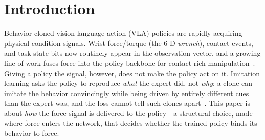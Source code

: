 \section{Introduction}
\label{sec:intro}

Behavior-cloned vision-language-action (VLA) policies are rapidly acquiring physical condition
signals. Wrist force/torque (the 6-D \emph{wrench}), contact events, and task-state bits now
routinely appear in the
observation vector, and a growing line of work fuses force into the policy backbone for
contact-rich manipulation~\cite{forcevla,phaforce,forceflow,filic}. Giving a policy the
signal, however, does not make the policy act on it. Imitation learning asks the policy to
reproduce \emph{what} the expert did, not \emph{why}: a clone can imitate the behavior
convincingly while being driven by entirely different cues than the expert was, and the loss
cannot tell such clones apart~\cite{dehaan2019causal,geirhos2020shortcut}. This paper is
about \emph{how} the force signal is delivered to the policy---a structural choice, made where
force enters the network, that decides whether the trained policy binds its behavior to force.

